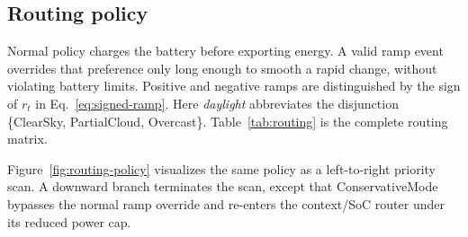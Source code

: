 \documentclass[
	letterpaper,
	10pt,
	unnumberedsections,
	twoside,
]{LTJournalArticle}
\newcommand{\valueof}[1]{\textsf{#1}}
\begin{document}
\subsection{Routing policy}

Normal policy charges the battery before exporting energy. A valid ramp event overrides that preference only long enough to smooth a rapid change, without violating battery limits. Positive and negative ramps are distinguished by the sign of $r_t$ in Eq.~\eqref{eq:signed-ramp}. Here \emph{daylight} abbreviates the disjunction \{\valueof{ClearSky}, \valueof{PartialCloud}, \valueof{Overcast}\}. Table~\ref{tab:routing} is the complete routing matrix.

Figure~\ref{fig:routing-policy} visualizes the same policy as a left-to-right priority scan. A downward branch terminates the scan, except that \valueof{ConservativeMode} bypasses the normal ramp override and re-enters the context/SoC router under its reduced power cap.
\end{document}
